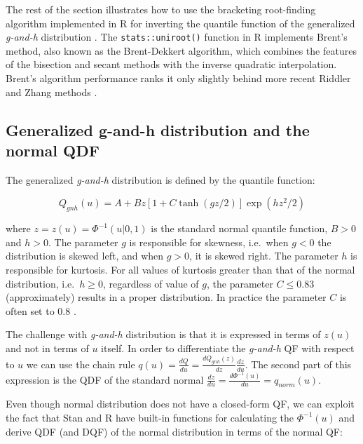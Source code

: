 \documentclass[
  12pt,
]{article}
\begin{document}
The rest of the section illustrates how to use the bracketing root-finding algorithm implemented in R for inverting the quantile function of the generalized \emph{g-and-h} distribution \citep{rayner2002NumericalMaximumLikelihood}. The \texttt{stats::uniroot()} function in R implements Brent's method, also known as the Brent-Dekkert algorithm, which combines the features of the bisection and secant methods with the inverse quadratic interpolation. Brent's algorithm performance ranks it only slightly behind more recent Riddler and Zhang methods \citep{stage2013CommentsImprovementBrent, zhang2011ImprovementBrentMethod}.

\hypertarget{generalized-g-and-h-distribution-and-the-normal-qdf}{%
\subsection{Generalized g-and-h distribution and the normal QDF}\label{generalized-g-and-h-distribution-and-the-normal-qdf}}

The generalized \emph{g-and-h} distribution is defined by the quantile function:

\[
Q_{gnh}(u)=A+Bz[1+C\tanh(gz/2)]\exp(hz^2/2)
\]

where \(z=z(u)=\Phi^{-1}(u|0,1)\) is the standard normal quantile function, \(B>0\) and \(h>0\). The parameter \(g\) is responsible for skewness, i.e.~when \(g<0\) the distribution is skewed left, and when \(g>0\), it is skewed right. The parameter \(h\) is responsible for kurtosis. For all values of kurtosis greater than that of the normal distribution, i.e.~\(h\geq 0\), regardless of value of \(g\), the parameter \(C \leq 0.83\) (approximately) results in a proper distribution. In practice the parameter \(C\) is often set to 0.8 \citep{haynes2005BayesianEstimationGandk, rayner2002NumericalMaximumLikelihood}.

The challenge with \emph{g-and-h} distribution is that it is expressed in terms of \(z(u)\) and not in terms of \(u\) itself. In order to differentiate the \emph{g-and-h} QF with respect to \(u\) we can use the chain rule \(q(u)=\frac{dQ}{du}=\frac{dQ_{gnh}(z)}{dz}\frac{dz}{du}\). The second part of this expression is the QDF of the standard normal \(\frac{dz}{du}=\frac{d\Phi^{-1}(u)}{du}=q_{norm}(u)\).

Even though normal distribution does not have a closed-form QF, we can exploit the fact that Stan and R have built-in functions for calculating the \(\Phi^{-1}(u)\) and derive QDF (and DQF) of the normal distribution in terms of the normal QF:
\end{document}

